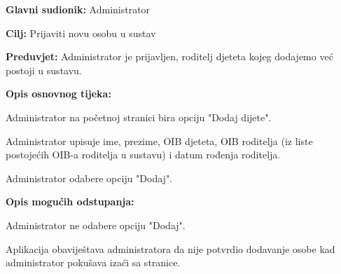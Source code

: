 					\noindent {}
					\begin{packed_item}
						
						\item \textbf{Glavni sudionik: }Administrator
						\item  \textbf{Cilj:} Prijaviti novu osobu u sustav
						\item  \textbf{Preduvjet:} Administrator je prijavljen, roditelj djeteta kojeg dodajemo već postoji u sustavu.
						\item  \textbf{Opis osnovnog tijeka:}
						
						\item[] \begin{packed_enum}
							
							\item Administrator na početnoj stranici bira opciju "Dodaj dijete".
							\item Administrator upisuje ime, prezime, OIB djeteta, OIB roditelja (iz liste postojećih OIB-a roditelja u sustavu) i datum rođenja roditelja.
							\item Administrator odabere opciju "Dodaj".
						\end{packed_enum}
						
						\item  \textbf{Opis mogućih odstupanja:}
						
						\item[] \begin{packed_item}
							
							
							\item[3.a] Administrator ne odabere opciju "Dodaj".
							\item[] \begin{packed_enum}
								
								\item Aplikacija obaviještava administratora da nije potvrdio dodavanje osobe kad administrator pokušava izaći sa stranice.
							\end{packed_enum}
							
							
						\end{packed_item}
						
						
					\end{packed_item}
					
